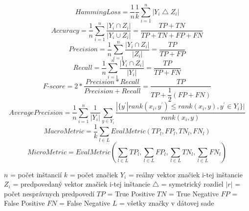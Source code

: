 \begin{equation}
	HammingLoss =  \dfrac{1}{n} \dfrac{1}{k} \sum_{i=1}^{n} | Y_{i} \bigtriangleup Z_{i} | \label{rovnica1}
\end{equation}
\begin{equation}
	Accuracy =  \dfrac{1}{n}  \sum_{i=1}^{n} \dfrac{| Y_{i} \cap Z_{i} |} {| Y_{i} \cup Z_{i} |} = \dfrac{TP + TN}{TP + TN + FP + FN} \label{rovnica2}
\end{equation}
\begin{equation}
	Precision =  \dfrac{1}{n}  \sum_{i=1}^{n} \dfrac{| Y_{i} \cap Z_{i} |} {| Z_{i} |} = \dfrac{TP}{TP + FP} \label{rovnica3}
\end{equation}
\begin{equation}
	Recall =  \dfrac{1}{n}  \sum_{i=1}^{n} \dfrac{| Y_{i} \cap Z_{i} |} {| Y_{i} |} = \dfrac{TP}{TP + FN} \label{rovnica4}
\end{equation}
\begin{equation}
	\textit{F-score} =  2* \dfrac{Precision*Recall}{Precision+Recall} =  \dfrac{TP}{TP + \dfrac{1}{2} (FP + FN)} \label{rovnica5}
\end{equation}
\begin{equation}
	AveragePrecision = \dfrac{1}{n}  \sum_{i=1}^{n} \dfrac{1}{| Y_{i} |} \sum_{y \in Y_{i}} 
	\dfrac{| \{ y^{'}|rank(x_{i},y^{'}) \leq rank(x_{i},y), y^{'} \in  Y_{i} \}|} {rank(x_{i},y)} \label{rovnica6}
\end{equation}
\begin{equation}
	MacroMetric =  \dfrac{1}{k} \sum_{l \in L} EvalMetric(TP_{l},FP_{l},TN_{l},FN_{l})  \label{rovnica7}
\end{equation}
\begin{equation}
	MicroMetric =  EvalMetric( \sum_{l \in L} TP_{l}, \sum_{l \in L} FP_{l}, \sum_{l \in L} TN_{l}, \sum_{l \in L} FN_{l} )  \label{rovnica8}
\end{equation}


\noindent\(n\) = počet inštancií \newline
\(k\) = počet značiek  \newline
\(Y_{i}\) = reálny vektor značiek i-tej inštancie  \newline
\(Z_{i}\) = predpovedaný vektor značiek i-tej inštancie \newline
\(\bigtriangleup\) = symetrický rozdiel  \newline
\(|r|\) = počet nesprávnych predpovedí \newline
\(TP\) = True Positive \newline
\(TN\) = True Negative \newline
\(FP\) = False Positive \newline
\(FN\) = False Negative \newline
\(L\) = všetky značky v dátovej sade  \newline



